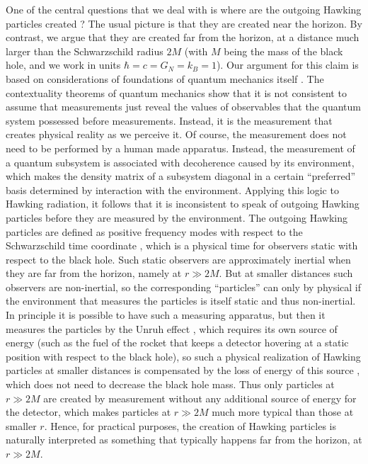 \documentclass[aps,prd,onecolumn,groupedaddress,showkeys,12pt]{revtex4-2}
\begin{document}
One of the central questions that we deal with is where are the outgoing Hawking particles created
\cite{unruh_where1,unruh_where2,giddings_where,hod_where}?
The usual picture is that they are created near the horizon. By contrast, we argue that they are created 
far from the horizon, at a distance much larger than the Schwarzschild radius $2M$ 
(with $M$ being the mass of the black hole, and we work in units $\hbar=c=G_N=k_B=1$).
Our argument for this claim is based on considerations of foundations of quantum mechanics itself
\cite{laloe}. The contextuality theorems of quantum mechanics \cite{KS,bell,peres,laloe}
show that it is not consistent to assume that measurements just reveal the values of observables 
that the quantum system possessed before measurements. Instead, it is the measurement that creates
physical reality as we perceive it. Of course, the measurement does not need to be performed by a human made apparatus.
Instead, the measurement of a quantum subsystem is associated with decoherence \cite{decoh1,decoh2}
caused by its environment, which makes the 
density matrix of a subsystem diagonal in a certain ``preferred'' basis determined by interaction with the environment. 
Applying this logic to Hawking radiation, 
it follows that it is inconsistent to speak of outgoing Hawking particles before they are measured
by the environment. The outgoing Hawking particles are defined as positive frequency modes with respect to the 
Schwarzschild time coordinate \cite{bd}, which is a physical time for observers static with respect to the black hole.
Such static observers are approximately inertial when they are far from the horizon, namely at $r\gg 2M$. But at smaller 
distances such observers are non-inertial, so the corresponding ``particles'' can only by physical 
if the environment that measures the particles is itself static and thus non-inertial. In principle it is possible 
to have such a measuring apparatus, but then it measures the particles by the Unruh effect \cite{unruh},
which requires its own source of energy
(such as the fuel of the rocket that keeps a detector hovering at a static position
with respect to the black hole), so such a physical realization of Hawking particles at smaller distances
is compensated by the loss of energy of this source \cite{mochizuki}, which  
does not need to decrease the black hole mass. 
Thus only particles at $r\gg 2M$ are created by measurement without any additional source of energy for the detector,
which makes particles at $r\gg 2M$ much more typical than those at smaller $r$.
Hence, for practical purposes, the creation of Hawking particles is naturally interpreted as something that typically happens 
far from the horizon, at $r\gg 2M$.
\end{document}
